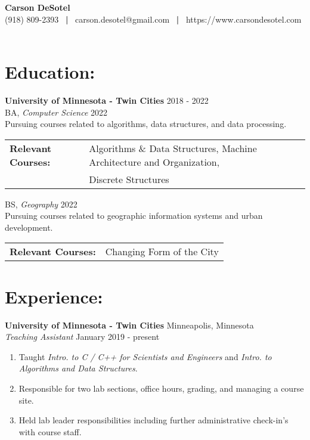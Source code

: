\documentclass[10pt]{article}
\begin{document}
	\begin{center}
		{\LARGE \textbf{Carson DeSotel}} \\
		\vspace{5pt} 		%
		(918) 809-2393 \ \textbf{|} \
		carson.desotel@gmail.com \ \textbf{|} \
		https://www.carsondesotel.com \
		
	\end{center}
		
	\section*{Education: \hrulefill} 
		\textbf{University of Minnesota - Twin Cities} \hfill 2018 - 2022 \\
		\indent BA, \textit{Computer Science} \hfill 2022 \\
		\indent \indent Pursuing courses related to algorithms, data structures, and data processing. \\
		\indent \indent 
		\begin{tabular}{@{}l@{\ }l}
		\textbf{Relevant Courses: } & Algorithms \& Data Structures, Machine Architecture and Organization, \\ & Discrete Structures \\
		\end{tabular}
		
		\vspace{5pt}
		
		\indent BS, \textit{Geography} \hfill 2022 \\
		\indent \indent Pursuing courses related to geographic information systems and urban development. \\
		\indent \indent
		\begin{tabular}{@{}l@{\ }l}
		\textbf{Relevant Courses: } & Changing Form of the City \\
		\end{tabular}
			
	\section*{Experience: \hrulefill}
		\textbf{University of Minnesota - Twin Cities} \hfill Minneapolis, Minnesota \\
		\textit{Teaching Assistant} \hfill January 2019 - present 
		\begin{enumerate}[label=--]
			\item Taught \textit{Intro. to C / C++ for Scientists and Engineers} and \textit{Intro. to Algorithms and Data Structures}.
			\item Responsible for two lab sections, office hours, grading, and managing a course site.
			\item Held lab leader responsibilities including further administrative check-in's with course staff.
		\end{enumerate}
		
\end{document}
